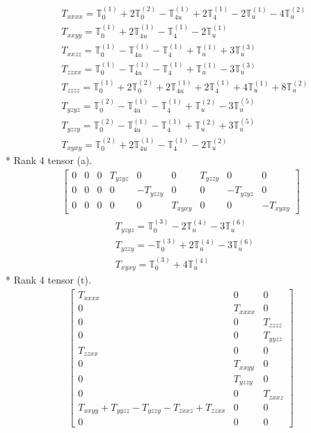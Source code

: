 \documentclass[fleqn,8pt,landscape]{jsarticle}
\begin{document}
\begin{align*}
& T_{xxxx} = \mathbb{T}_{0}^{(1)} + 2 \mathbb{T}_{0}^{(2)} - \mathbb{T}_{4u}^{(1)} + 2 \mathbb{T}_{4}^{(1)} - 2 \mathbb{T}_{u}^{(1)} - 4 \mathbb{T}_{u}^{(2)} \\
& T_{xxyy} = \mathbb{T}_{0}^{(1)} + 2 \mathbb{T}_{4u}^{(1)} - \mathbb{T}_{4}^{(1)} - 2 \mathbb{T}_{u}^{(1)} \\
& T_{xxzz} = \mathbb{T}_{0}^{(1)} - \mathbb{T}_{4u}^{(1)} - \mathbb{T}_{4}^{(1)} + \mathbb{T}_{u}^{(1)} + 3 \mathbb{T}_{u}^{(3)} \\
& T_{zzxx} = \mathbb{T}_{0}^{(1)} - \mathbb{T}_{4u}^{(1)} - \mathbb{T}_{4}^{(1)} + \mathbb{T}_{u}^{(1)} - 3 \mathbb{T}_{u}^{(3)} \\
& T_{zzzz} = \mathbb{T}_{0}^{(1)} + 2 \mathbb{T}_{0}^{(2)} + 2 \mathbb{T}_{4u}^{(1)} + 2 \mathbb{T}_{4}^{(1)} + 4 \mathbb{T}_{u}^{(1)} + 8 \mathbb{T}_{u}^{(2)} \\
& T_{yzyz} = \mathbb{T}_{0}^{(2)} - \mathbb{T}_{4u}^{(1)} - \mathbb{T}_{4}^{(1)} + \mathbb{T}_{u}^{(2)} - 3 \mathbb{T}_{u}^{(5)} \\
& T_{yzzy} = \mathbb{T}_{0}^{(2)} - \mathbb{T}_{4u}^{(1)} - \mathbb{T}_{4}^{(1)} + \mathbb{T}_{u}^{(2)} + 3 \mathbb{T}_{u}^{(5)} \\
& T_{xyxy} = \mathbb{T}_{0}^{(2)} + 2 \mathbb{T}_{4u}^{(1)} - \mathbb{T}_{4}^{(1)} - 2 \mathbb{T}_{u}^{(2)}
\end{align*}
* Rank 4 tensor (a).
\begin{align*}
\begin{bmatrix} 0 & 0 & 0 & T_{yzyz} & 0 & 0 & T_{yzzy} & 0 & 0 \\ 0 & 0 & 0 & 0 & - T_{yzzy} & 0 & 0 & - T_{yzyz} & 0 \\ 0 & 0 & 0 & 0 & 0 & T_{xyxy} & 0 & 0 & - T_{xyxy} \end{bmatrix}
\end{align*}
\begin{align*}
& T_{yzyz} = \mathbb{T}_{0}^{(3)} - 2 \mathbb{T}_{u}^{(4)} - 3 \mathbb{T}_{u}^{(6)} \\
& T_{yzzy} = - \mathbb{T}_{0}^{(3)} + 2 \mathbb{T}_{u}^{(4)} - 3 \mathbb{T}_{u}^{(6)} \\
& T_{xyxy} = \mathbb{T}_{0}^{(3)} + 4 \mathbb{T}_{u}^{(4)}
\end{align*}
* Rank 4 tensor (t).
\begin{align*}
\begin{bmatrix} T_{xxxx} & 0 & 0 \\ 0 & T_{xxxx} & 0 \\ 0 & 0 & T_{zzzz} \\ 0 & 0 & T_{yyzz} \\ T_{zzxx} & 0 & 0 \\ 0 & T_{xxyy} & 0 \\ 0 & T_{yzzy} & 0 \\ 0 & 0 & T_{zxxz} \\ T_{xxyy} + T_{yyzz} - T_{yzzy} - T_{zxxz} + T_{zzxx} & 0 & 0 \\ 0 & 0 & 0 \end{bmatrix}
\end{align*}
\end{document}
